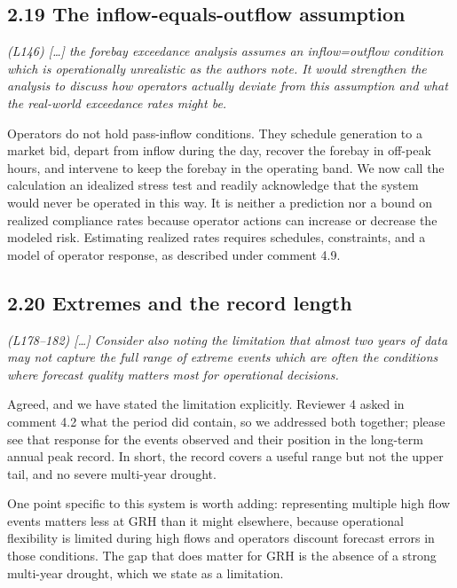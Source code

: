 \documentclass[11pt]{article}
\newenvironment{rc}%
  {\begin{list}{}{\setlength{\leftmargin}{1.5em}\setlength{\rightmargin}{1.5em}%
   \setlength{\topsep}{0.2em}\setlength{\parsep}{0pt}\setlength{\itemsep}{0pt}}%
   \item[]\itshape\color{quotegray}}%
  {\end{list}}
\begin{document}
\subsection*{2.19 The inflow-equals-outflow assumption}

\begin{rc}
(L146) [\ldots] the forebay exceedance analysis assumes an inflow=outflow condition which
is operationally unrealistic as the authors note. It would strengthen the analysis to
discuss how operators actually deviate from this assumption and what the real-world
exceedance rates might be.
\end{rc}

Operators do not hold pass-inflow conditions. They schedule generation to a market bid, depart
from inflow during the day, recover the forebay in off-peak hours, and intervene to keep the forebay 
in the operating band. We now call the calculation an idealized stress test and readily acknowledge that
the system would never be operated in this way. It is neither a prediction nor a bound on
realized compliance rates because operator actions can increase or decrease the modeled risk. 
Estimating realized rates requires schedules, constraints, and a model of operator response, as
described under comment 4.9.

\subsection*{2.20 Extremes and the record length}

\begin{rc}
(L178--182) [\ldots] Consider also noting the limitation that almost two years of data may
not capture the full range of extreme events which are often the conditions where forecast
quality matters most for operational decisions.
\end{rc}

Agreed, and we have stated the limitation explicitly. Reviewer 4 asked in comment 4.2 what the
period did contain, so we addressed both together; please see that response for the events
observed and their position in the long-term annual peak record. In short, the record covers a
useful range but not the upper tail, and no severe multi-year drought.

One point specific to this system is worth adding: representing multiple high flow events
matters less at GRH than it might elsewhere, because operational flexibility is limited during
high flows and operators discount forecast errors in those conditions. The gap that does matter
for GRH is the absence of a strong multi-year drought, which we state as a limitation.
\end{document}
